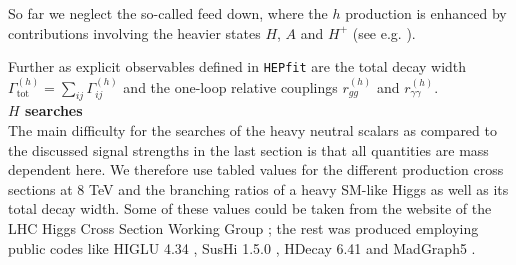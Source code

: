 \documentclass[preprint,3p,12pt]{elsarticle}
\newcommand{\HEPfit}{\texttt{HEPfit}\xspace}
\begin{document}
So far we neglect the so-called feed down, where the $h$ production is enhanced by contributions involving the heavier states $H$, $A$ and $H^+$ (see e.g. \cite{Dumont:2014wha}).

Further as explicit observables defined in \HEPfit are the total decay width $\Gamma^{(h)}_{\text{tot}}=\sum_{ij}\Gamma_{ij}^{(h)}$ and the one-loop relative couplings $r_{gg}^{(h)}$ and $r_{\gamma \gamma}^{(h)}$.\\

\textbf{$H$ searches}\\

The main difficulty for the searches of the heavy neutral scalars as compared to the discussed signal strengths in the last section is that all quantities are mass dependent here. We therefore use tabled values for the different production cross sections at 8 TeV and the branching ratios of a heavy SM-like Higgs as well as its total decay width. Some of these values could be taken from the website of the LHC Higgs Cross Section Working Group \cite{LHCHXSWG}; the rest was produced employing public codes like HIGLU 4.34 \cite{Spira:1995mt}, SusHi 1.5.0 \cite{Harlander:2012pb}, HDecay 6.41 \cite{Djouadi:1997yw} and MadGraph5 \cite{Alwall:2014hca}.
\end{document}
